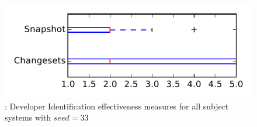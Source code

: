 
\begin{figure}
\centering
\includegraphics[height=0.4\textheight]{figures/dit_seed/rq1_tiny_33}
\caption{\rtwo: Developer Identification effectiveness measures for all subject systems with $seed=33$}
\label{fig:dit_seed:rq1:tiny}
\end{figure}
